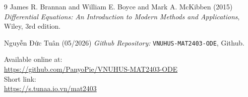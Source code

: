 \begin{thebibliography}{9}
	James R. Brannan and William E. Boyce and Mark A. McKibben (2015) \emph{Differential Equations: An Introduction to Modern Methods and Applications}, Wiley, 3rd edition.
	
	Nguyễn Đức Tuân (05/2026) \emph{Github Repository:} \texttt{VNUHUS-MAT2403-ODE}, Github.
	\begin{flushleft}
		\small
		Available online at: \\ 
		\url{https://github.com/PanyoPie/VNUHUS-MAT2403-ODE} \\
		Short link: \\
		\url{https://s.tunaa.io.vn/mat2403}
	\end{flushleft}
\end{thebibliography}